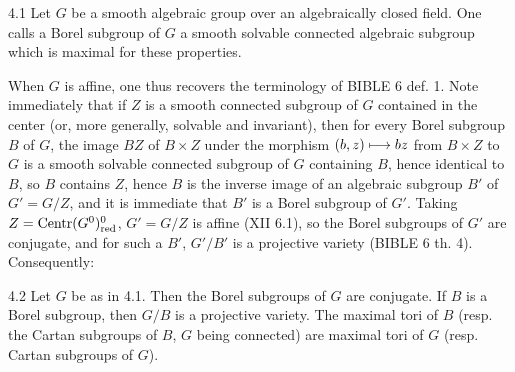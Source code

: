 \begin{definition}{4.1}\label{XIV.4.1}
Let $G$ be a smooth
algebraic group over
an algebraically
closed field. One
calls a Borel subgroup
of $G$ a smooth
solvable connected
algebraic subgroup
which is maximal
for these properties.
\end{definition}
When $G$ is affine,
one thus recovers
the terminology of
BIBLE 6 def. 1.
Note immediately
that if $Z$ is a
smooth connected
subgroup of $G$
contained in the
center (or, more
generally, solvable
and invariant), then
for every Borel
subgroup $B$ of $G$,
the image $BZ$ of
$B\times Z$ under
the morphism
$(b,z)\longmapsto bz$
from $B\times Z$
to $G$ is a
smooth solvable
connected subgroup
of $G$ containing
$B$, hence identical
to $B$, so $B$
contains $Z$, hence
$B$ is the inverse
image of an
algebraic subgroup
$B'$ of $G'=G/Z$,
and it is immediate
that $B'$ is a
Borel subgroup of
$G'$. Taking
$Z=\operatorname{Centr}(G^0)^0_{\mathrm{red}}$,
$G'=G/Z$ is affine
(XII 6.1), so the
Borel subgroups of
$G'$ are conjugate,
and for such a
$B'$, $G'/B'$
is a projective
variety (BIBLE 6
th. 4). Consequently:

\begin{proposition}{4.2}\label{XIV.4.2}
Let $G$ be as in
4.1. Then the Borel
subgroups of $G$
are conjugate.
If $B$ is a Borel
subgroup, then
$G/B$ is a
projective variety.
The maximal tori
of $B$ (resp. the
Cartan subgroups of
$B$, $G$ being
connected) are
maximal tori of
$G$ (resp. Cartan
subgroups of $G$).
\end{proposition}
